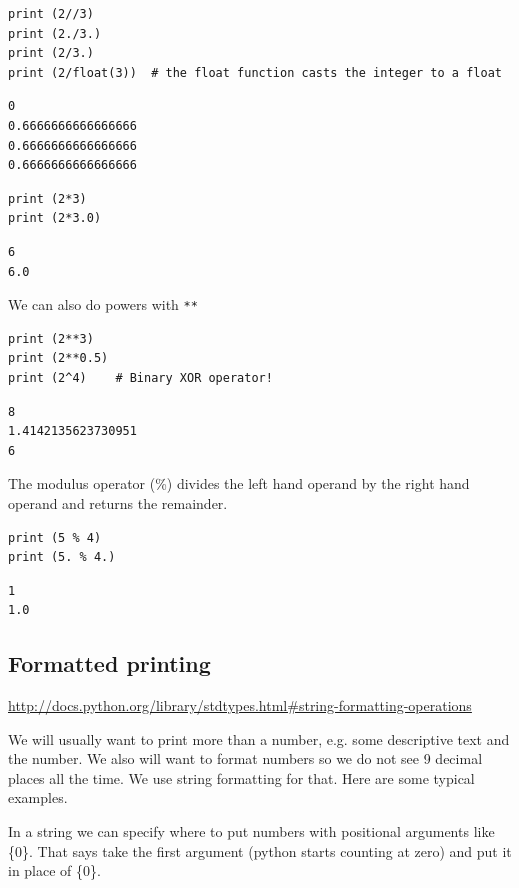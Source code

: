\documentclass[11pt]{article}
\begin{document}
\begin{verbatim}
print (2//3)
print (2./3.)
print (2/3.)
print (2/float(3))  # the float function casts the integer to a float
\end{verbatim}

\begin{verbatim}
0
0.6666666666666666
0.6666666666666666
0.6666666666666666
\end{verbatim}

\begin{verbatim}
print (2*3)
print (2*3.0)
\end{verbatim}

\begin{verbatim}
6
6.0
\end{verbatim}

We can also do powers with \texttt{**}

\begin{verbatim}
print (2**3)
print (2**0.5)
print (2^4)    # Binary XOR operator!
\end{verbatim}

\begin{verbatim}
8
1.4142135623730951
6
\end{verbatim}

The modulus operator (\%) divides the left hand operand by the right hand operand and returns the remainder.

\begin{verbatim}
print (5 % 4)
print (5. % 4.)
\end{verbatim}

\begin{verbatim}
1
1.0
\end{verbatim}


\subsection{Formatted printing}
\label{sec:org96edea0}
\url{http://docs.python.org/library/stdtypes.html\#string-formatting-operations}

We will usually want to print more than a number, e.g. some descriptive text and the number. We also will want to format numbers so we do not see 9 decimal places all the time. We use string formatting for that. Here are some typical examples.

In a string we can specify where to put numbers with positional arguments like \{0\}. That says take the first argument (python starts counting at zero) and put it in place of \{0\}.
\end{document}

